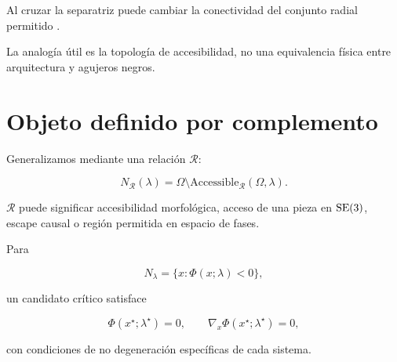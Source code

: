 Al cruzar la separatriz puede cambiar la conectividad del conjunto radial permitido \cite{kerr1963,wald1984}.

La analogía útil es la topología de accesibilidad, no una equivalencia física entre arquitectura y agujeros negros.

\section{Objeto definido por complemento}

Generalizamos mediante una relación \(\mathcal R\):

\begin{definition}
\begin{equation}
\boxed{
N_{\mathcal R}(\lambda)
=
\Omega
\setminus
\mathrm{Accessible}_{\mathcal R}(\Omega,\lambda).
}
\end{equation}
\end{definition}

\(\mathcal R\) puede significar accesibilidad morfológica, acceso de una pieza en \(\mathrm{SE}(3)\), escape causal o región permitida en espacio de fases.

Para

\begin{equation}
N_\lambda
=
\{x:\Phi(x;\lambda)<0\},
\end{equation}

un candidato crítico satisface

\begin{equation}
\boxed{
\Phi(x^\star;\lambda^\star)=0,
\qquad
\nabla_x\Phi(x^\star;\lambda^\star)=0,
}
\end{equation}

con condiciones de no degeneración específicas de cada sistema.
